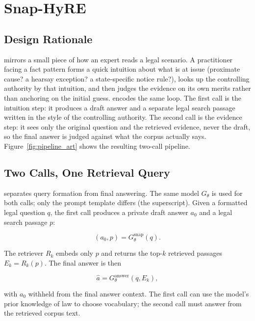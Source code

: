 \section{Snap-HyRE}\label{sec:method}

\subsection{Design Rationale}

\hyre{} mirrors a small piece of how an expert reads a legal scenario. A
practitioner facing a fact pattern forms a quick intuition about what is at
issue (proximate cause? a hearsay exception? a state-specific notice rule?),
looks up the controlling authority by that intuition, and then judges the
evidence on its own merits rather than anchoring on the initial guess.
\hyre{} encodes the same loop. The first call is the intuition step: it
produces a draft answer and a separate legal search passage written in the
style of the controlling authority. The second call is the evidence step:
it sees only the original question and the retrieved evidence, never the
draft, so the final answer is judged against what the corpus actually says.
Figure~\ref{fig:pipeline_art} shows the resulting two-call pipeline.

\subsection{Two Calls, One Retrieval Query}\label{sec:method:snaphyre}

\hyre{} separates query formation from final answering. The same model
$G_\theta$ is used for both calls; only the prompt template differs (the
superscript). Given a formatted legal question $q$, the first call produces
a private draft answer $a_0$ and a legal search passage $p$:

\begin{equation}
(a_0, p) = G_{\theta}^{\mathrm{snap}}(q).
\end{equation}

The retriever $R_k$ embeds only $p$ and returns the top-$k$ retrieved
passages $E_k = R_k(p)$. The final answer is then

\begin{equation}
\hat{a} = G_{\theta}^{\mathrm{answer}}(q, E_k),
\end{equation}

with $a_0$ withheld from the final answer context. The first call can use
the model's prior knowledge of law to choose vocabulary; the second call
must answer from the retrieved corpus text.

